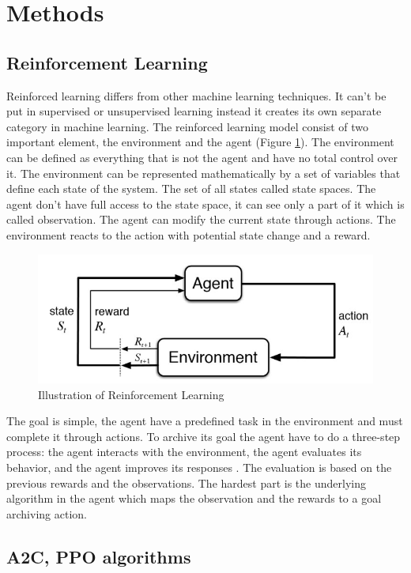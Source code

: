 \documentclass{article}
\begin{document}
\section{\large{Methods}}

\subsection{\normalsize{Reinforcement Learning}}

Reinforced learning differs from other machine learning techniques. It can't be put in supervised or unsupervised learning instead it creates its own separate category in machine learning. The reinforced learning model consist of two important element, the environment and the agent (Figure \ref{fig:statemachin}). The environment can be defined as everything that is not the agent and have no total control over it. The environment can be represented mathematically by a set of variables that define each state of the system. The set of all states called state spaces. The agent don't have full access to the state space, it can see only a part of it which is called observation. The agent can modify the current state through actions. The environment reacts to the action with potential state change and a reward.


\begin{figure}[h!]
	\centering
	\includegraphics[width=0.8\linewidth]{rl.jpg}
	\caption{Illustration of Reinforcement Learning}
	\label{fig:statemachin}
\end{figure}

The goal is simple, the agent have a predefined task in the environment and must complete it through actions. To archive its goal the agent have to do a three-step process: the agent interacts with the environment, the agent evaluates its behavior, and the agent improves its responses \cite{dlr_book}. The evaluation is based on the previous rewards and the observations. The hardest part is the underlying algorithm in the agent which maps the observation and the rewards to a goal archiving action.

\subsection{\normalsize{A2C, PPO algorithms}}
\end{document}
